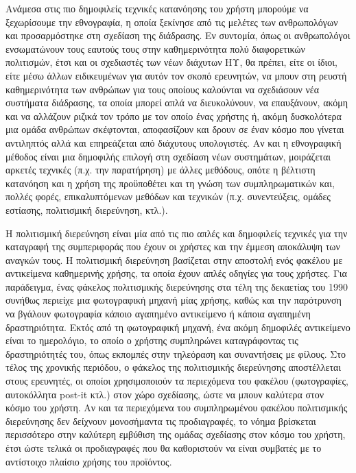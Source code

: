 \documentclass[
]{article}
\begin{document}
Ανάμεσα στις πιο δημοφιλείς τεχνικές κατανόησης του χρήστη μπορούμε να
ξεχωρίσουμε την εθνογραφία, η οποία ξεκίνησε από τις μελέτες των
ανθρωπολόγων και προσαρμόστηκε στη σχεδίαση της διάδρασης. Εν συντομία,
όπως οι ανθρωπολόγοι ενσωματώνουν τους εαυτούς τους στην καθημερινότητα
πολύ διαφορετικών πολιτισμών, έτσι και οι σχεδιαστές των νέων διάχυτων
ΗΥ, θα πρέπει, είτε οι ίδιοι, είτε μέσω άλλων ειδικευμένων για αυτόν τον
σκοπό ερευνητών, να μπουν στη ρευστή καθημερινότητα των ανθρώπων για
τους οποίους καλούνται να σχεδιάσουν νέα συστήματα διάδρασης, τα οποία
μπορεί απλά να διευκολύνουν, να επαυξάνουν, ακόμη και να αλλάζουν ριζικά
τον τρόπο με τον οποίο ένας χρήστης ή, ακόμη δυσκολότερα μια ομάδα
ανθρώπων σκέφτονται, αποφασίζουν και δρουν σε έναν κόσμο που γίνεται
αντιληπτός αλλά και επηρεάζεται από διάχυτους υπολογιστές. Αν και η
εθνογραφική μέθοδος είναι μια δημοφιλής επιλογή στη σχεδίαση νέων
συστημάτων, μοιράζεται αρκετές τεχνικές (π.χ. την παρατήρηση) με άλλες
μεθόδους, οπότε η βέλτιστη κατανόηση και η χρήση της προϋποθέτει και τη
γνώση των συμπληρωματικών και, πολλές φορές, επικαλυπτόμενων μεθόδων και
τεχνικών (π.χ. συνεντεύξεις, ομάδες εστίασης, πολιτισμική διερεύνηση,
κτλ.).

Η πολιτισμική διερεύνηση είναι μία από τις πιο απλές και δημοφιλείς
τεχνικές για την καταγραφή της συμπεριφοράς που έχουν οι χρήστες και την
έμμεση αποκάλυψη των αναγκών τους. Η πολιτισμική διερεύνηση βασίζεται
στην αποστολή ενός φακέλου με αντικείμενα καθημερινής χρήσης, τα οποία
έχουν απλές οδηγίες για τους χρήστες. Για παράδειγμα, ένας φάκελος
πολιτισμικής διερεύνησης στα τέλη της δεκαετίας του 1990 συνήθως
περιείχε μια φωτογραφική μηχανή μίας χρήσης, καθώς και την παρότρυνση να
βγάλουν φωτογραφία κάποιο αγαπημένο αντικείμενο ή κάποια αγαπημένη
δραστηριότητα. Εκτός από τη φωτογραφική μηχανή, ένα ακόμη δημοφιλές
αντικείμενο είναι το ημερολόγιο, το οποίο ο χρήστης συμπληρώνει
καταγράφοντας τις δραστηριότητές του, όπως εκπομπές στην τηλεόραση και
συναντήσεις με φίλους. Στο τέλος της χρονικής περιόδου, ο φάκελος της
πολιτισμικής διερεύνησης αποστέλλεται στους ερευνητές, οι οποίοι
χρησιμοποιούν τα περιεχόμενα του φακέλου (φωτογραφίες, αυτοκόλλητα
post-it κτλ.) στον χώρο σχεδίασης, ώστε να μπουν καλύτερα στον κόσμο του
χρήστη. Αν και τα περιεχόμενα του συμπληρωμένου φακέλου πολιτισμικής
διερεύνησης δεν δείχνουν μονοσήμαντα τις προδιαγραφές, το νόημα
βρίσκεται περισσότερο στην καλύτερη εμβύθιση της ομάδας σχεδίασης στον
κόσμο του χρήστη, έτσι ώστε τελικά οι προδιαγραφές που θα καθοριστούν να
είναι συμβατές με το αντίστοιχο πλαίσιο χρήσης του προϊόντος.
\end{document}
